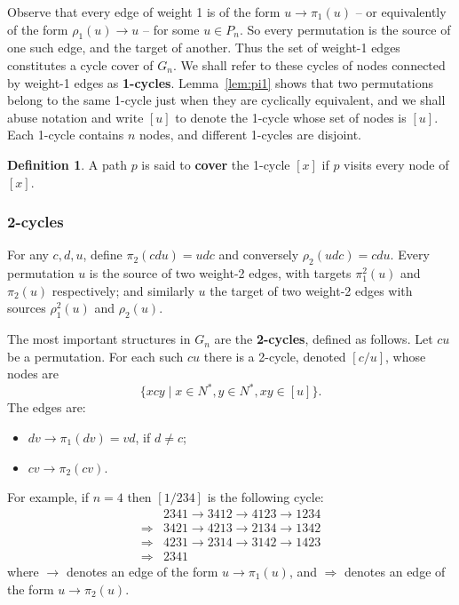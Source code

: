 \documentclass[a4paper]{article}
\theoremstyle{definition}
\newtheorem{defn}{Definition}[section]
\theoremstyle{remark}
\let\definiendum\textbf
\begin{document}
Observe that every edge of weight 1 is of the form $u\to\pi_1(u)$ -- or equivalently of the form $\rho_1(u)\to u$ -- for some $u\in P_n$. So every permutation is the source of one such edge, and the target of another. Thus the set of weight-1 edges constitutes a cycle cover of $G_n$. We shall refer to these cycles of nodes connected by weight-1 edges as \definiendum{1-cycles}. Lemma~\ref{lem:pi1} shows that two permutations belong to the same 1-cycle just when they are cyclically equivalent, and we shall abuse notation and write $[u]$ to denote the 1-cycle whose set of nodes is $[u]$. Each 1-cycle contains $n$ nodes, and different 1-cycles are disjoint.

\begin{defn}\label{def:covers}
    A path $p$ is said to \definiendum{cover} the 1-cycle $[x]$ if $p$ visits every node of $[x]$.
\end{defn}

\subsubsection{2-cycles}
For any $c, d, u$, define $\pi_2(cdu) = udc$ and conversely $\rho_2(udc)=cdu$.
Every permutation $u$ is the source of two weight-2 edges, with targets $\pi_1^2(u)$ and $\pi_2(u)$ respectively; and similarly $u$ the target of two weight-2 edges with sources $\rho_1^2(u)$ and $\rho_2(u)$.

The most important structures in $G_n$ are the \definiendum{2-cycles}, defined as follows. Let $cu$ be a permutation. For each such $cu$ there is a 2-cycle, denoted $[c/u]$, whose nodes are
\[
    \{ xcy \;|\; x\in N^*, y\in N^*, xy \in [u] \}.
\]
The edges are:
\begin{itemize}
    \item $dv\to\pi_1(dv) = vd$, if $d\ne c$;
    \item $cv\to\pi_2(cv)$.
\end{itemize}

\let\To\Rightarrow
For example, if $n=4$ then $[1/234]$ is the following cycle:
\begin{align*}
    &2341 \to 3412 \to 4123 \to 1234\\
    \To{} &3421 \to 4213 \to 2134 \to 1342\\
    \To{} &4231 \to 2314 \to 3142 \to 1423\\
    \To{} &2341
\end{align*}
where $\to$ denotes an edge of the form $u\to\pi_1(u)$, and $\To$ denotes an edge of the form $u\to\pi_2(u)$.
\end{document}
